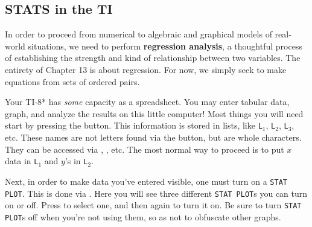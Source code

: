 
\subsection{STATS in the TI}



In order to proceed from numerical to algebraic and graphical models of
real-world situations, we need to perform \textbf{regression analysis}, a thoughtful
process of establishing the strength and kind of relationship between two
variables.  The entirety of Chapter 13 is about regression.
For now, we simply seek to make equations from sets of ordered pairs.

Your TI-8* has \emph{some} capacity as a spreadsheet.  You may enter tabular data, 
graph, and analyze the results on this little computer!  Most things you will need start by
pressing the \Touche[style=function,principal={stat},raise=-5pt] button.
This information is stored in lists, like \texttt{L$_1$}, \texttt{L$_2$}, \texttt{L$_3$}, etc.  
These names are not letters found via the \Touche[style=alpha]
button, but are whole characters.  They can be accessed via \Touche[style=second]
\Touche[style=number, principal=1,second=L1], \Touche[style=second] 
\Touche[style=number, principal=2,second=L2], etc.  The most normal way to proceed is to put $x$ 
data in \texttt{L$_1$} and $y$'s in \texttt{L$_2$}.


Next, in order to make data you've entered visible, one must turn on a \texttt{STAT PLOT}.
This is done via \Touche[style=second] 
\Touche[style=graph,principal={y=},position = 0.9,second={stat plot},raise=-7pt].
Here you will see three different \texttt{STAT PLOT}s you can turn on or off.  Press
\Touche[style=enter,principal=enter,raise=-5pt] to select one, and then again to turn it on.
Be sure to turn \texttt{STAT PLOT}s off when you're not using them, so as not to obfuscate
other graphs.

